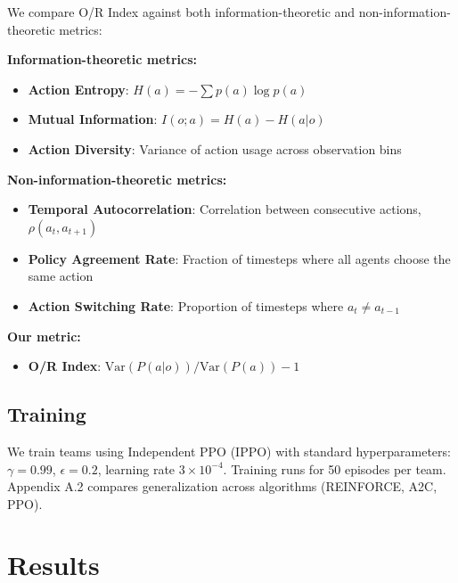 \documentclass[twoside]{article}
\theoremstyle{remark}
\begin{document}
We compare O/R Index against both information-theoretic and non-information-theoretic metrics:

\textbf{Information-theoretic metrics:}
\begin{itemize}
    \item \textbf{Action Entropy}: $H(a) = -\sum p(a) \log p(a)$
    \item \textbf{Mutual Information}: $I(o; a) = H(a) - H(a|o)$
    \item \textbf{Action Diversity}: Variance of action usage across observation bins
\end{itemize}

\textbf{Non-information-theoretic metrics:}
\begin{itemize}
    \item \textbf{Temporal Autocorrelation}: Correlation between consecutive actions, $\rho(a_t, a_{t+1})$
    \item \textbf{Policy Agreement Rate}: Fraction of timesteps where all agents choose the same action
    \item \textbf{Action Switching Rate}: Proportion of timesteps where $a_t \neq a_{t-1}$
\end{itemize}

\textbf{Our metric:}
\begin{itemize}
    \item \textbf{O/R Index}: $\text{Var}(P(a|o)) / \text{Var}(P(a)) - 1$
\end{itemize}

\subsection{Training}

We train teams using Independent PPO (IPPO) with standard hyperparameters: $\gamma = 0.99$, $\epsilon = 0.2$, learning rate $3 \times 10^{-4}$. Training runs for 50 episodes per team. Appendix A.2 compares generalization across algorithms (REINFORCE, A2C, PPO).

\section{Results}
\label{sec:main_results}
\end{document}

